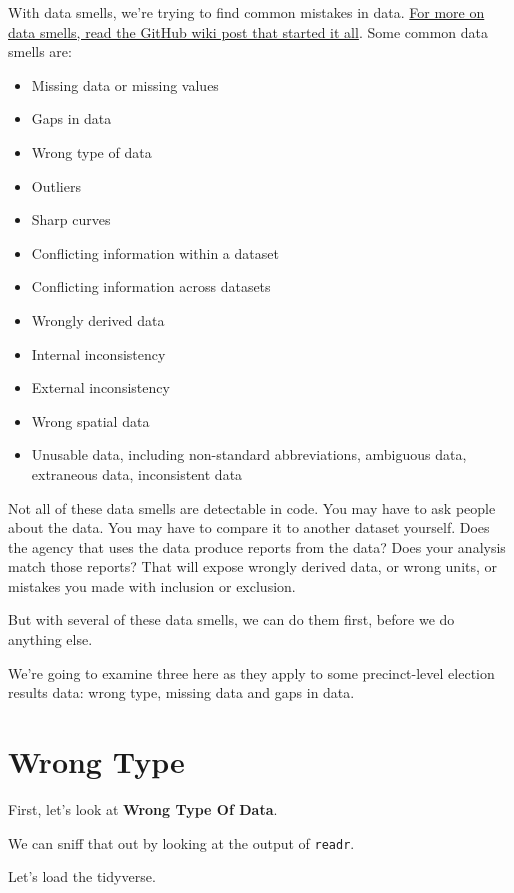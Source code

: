 \documentclass[
  letterpaper,
  DIV=11,
  numbers=noendperiod]{scrreprt}
\providecommand{\tightlist}{%
  \setlength{\itemsep}{0pt}\setlength{\parskip}{0pt}}\usepackage{longtable,booktabs,array}
\begin{document}
With data smells, we're trying to find common mistakes in data.
\href{https://github.com/nikeiubel/data-smells/wiki/Ensuring-Accuracy-in-Data-Journalism}{For
more on data smells, read the GitHub wiki post that started it all}.
Some common data smells are:

\begin{itemize}
\tightlist
\item
  Missing data or missing values
\item
  Gaps in data
\item
  Wrong type of data
\item
  Outliers
\item
  Sharp curves
\item
  Conflicting information within a dataset
\item
  Conflicting information across datasets
\item
  Wrongly derived data
\item
  Internal inconsistency
\item
  External inconsistency
\item
  Wrong spatial data
\item
  Unusable data, including non-standard abbreviations, ambiguous data,
  extraneous data, inconsistent data
\end{itemize}

Not all of these data smells are detectable in code. You may have to ask
people about the data. You may have to compare it to another dataset
yourself. Does the agency that uses the data produce reports from the
data? Does your analysis match those reports? That will expose wrongly
derived data, or wrong units, or mistakes you made with inclusion or
exclusion.

But with several of these data smells, we can do them first, before we
do anything else.

We're going to examine three here as they apply to some precinct-level
election results data: wrong type, missing data and gaps in data.

\hypertarget{wrong-type}{%
\section{Wrong Type}\label{wrong-type}}

First, let's look at \textbf{Wrong Type Of Data}.

We can sniff that out by looking at the output of \texttt{readr}.

Let's load the tidyverse.
\end{document}
